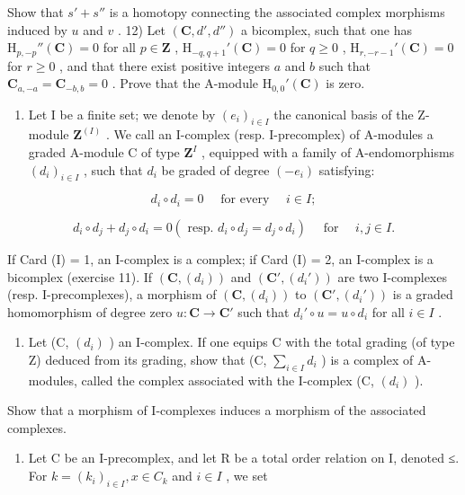 Show that \(s' + s''\) is a homotopy connecting the associated complex morphisms induced by \(u\) and \(v\) . 12) Let \((\mathbf{C}, d', d'')\) a bicomplex, such that one has \(\mathrm{H}_{p,-p}''(\mathbf{C}) = 0\) for all \(p \in \mathbf{Z}\) , \(\mathrm{H}_{-q,q+1}'(\mathbf{C}) = 0\) for \(q \geqslant 0\) , \(\mathrm{H}_{r,-r-1}'(\mathbf{C}) = 0\) for \(r \geqslant 0\) , and that there exist positive integers \(a\) and \(b\) such that \(\mathbf{C}_{a,-a} = \mathbf{C}_{-b,b} = 0\) . Prove that the A-module \(\mathrm{H}_{0,0}'(\mathbf{C})\) is zero.

\begin{enumerate}
\def\labelenumi{\arabic{enumi})}
\setcounter{enumi}{12}
\tightlist
\item
  Let I be a finite set; we denote by \((e_i)_{i\in I}\) the canonical basis of the Z-module \(\mathbf{Z}^{(I)}\) . We call an I-complex (resp. I-precomplex) of A-modules a graded A-module C of type \(\mathbf{Z}^{I}\) , equipped with a family of A-endomorphisms \((d_i)_{i\in I}\) , such that \(d_i\) be graded of degree \((-e_i)\) satisfying:
\end{enumerate}

\[
d _ {i} \circ d _ {i} = 0 \quad \text { for every } \quad i \in I;
\]

\[
d _ {i} \circ d _ {j} + d _ {j} \circ d _ {i} = 0 (\text { resp. } d _ {i} \circ d _ {j} = d _ {j} \circ d _ {i}) \quad \text { for } \quad i, j \in I.
\]

If Card (I) = 1, an I-complex is a complex; if Card (I) = 2, an I-complex is a bicomplex (exercise 11). If \((\mathbf{C}, (d_i))\) and \((\mathbf{C}', (d_i'))\) are two I-complexes (resp. I-precomplexes), a morphism of \((\mathbf{C}, (d_i))\) to \((\mathbf{C}', (d_i'))\) is a graded homomorphism of degree zero \(u: \mathbf{C} \to \mathbf{C}'\) such that \(d_i' \circ u = u \circ d_i\) for all \(i \in I\) .

\begin{enumerate}
\def\labelenumi{\alph{enumi})}
\tightlist
\item
  Let (C, \((d_i)\) ) an I-complex. If one equips C with the total grading (of type Z) deduced from its grading, show that (C, \(\sum_{i\in I}d_i\) ) is a complex of A-modules, called the complex associated with the I-complex (C, \((d_i)\) ).
\end{enumerate}

Show that a morphism of I-complexes induces a morphism of the associated complexes.

\begin{enumerate}
\def\labelenumi{\alph{enumi})}
\setcounter{enumi}{1}
\tightlist
\item
  Let C be an I-precomplex, and let R be a total order relation on I, denoted ≤. For \(k = (k_i)_{i \in I}, x \in C_k\) and \(i \in I\) , we set
\end{enumerate}

